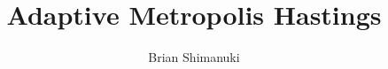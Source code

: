 \documentclass{article}
\title{Adaptive Metropolis Hastings}
\author{Brian Shimanuki}
\begin{document}
\maketitle

\begin{abstract}

\end{abstract}

\nocite{*}


\end{document}
